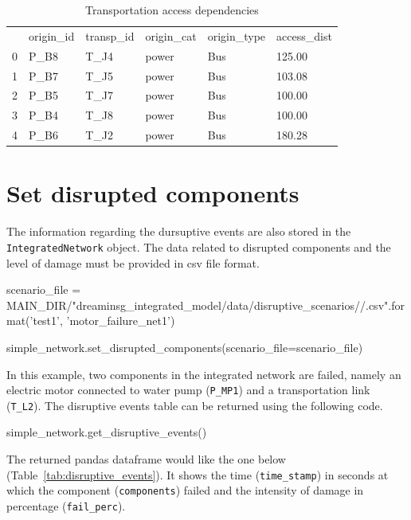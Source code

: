 \documentclass[letterpaper,12pt,english]{sphinxmanual}
\begin{document}
\begin{table}[h!]
	\caption{Transportation access dependencies}
	\centering
	\begin{tabular}{llllll}
		\rowcolor[HTML]{C0C0C0} 
		& origin\_id & transp\_id & origin\_cat & origin\_type & access\_dist \\
		0 & P\_B8      & T\_J4      & power       & Bus          & 125.00       \\
		\rowcolor[HTML]{EFEFEF} 
		1 & P\_B7      & T\_J5      & power       & Bus          & 103.08       \\
		2 & P\_B5      & T\_J7      & power       & Bus          & 100.00       \\
		\rowcolor[HTML]{EFEFEF} 
		3 & P\_B4      & T\_J8      & power       & Bus          & 100.00       \\
		4 & P\_B6      & T\_J2      & power       & Bus          & 180.28      
	\end{tabular}
\label{tab:access_table}
\end{table}


\section{Set disrupted components}
The information regarding the dursuptive events are also stored in the {\tt IntegratedNetwork} object. The data related to disrupted components and the level of damage must be provided in csv file format.
\begin{sphinxVerbatim}[commandchars=\\\{\}]
scenario_file = MAIN_DIR/"dreaminsg_integrated_model/data/disruptive_scenarios/{}/{}.csv".format('test1', 'motor_failure_net1')

simple_network.set_disrupted_components(scenario_file=scenario_file)
\end{sphinxVerbatim}

In this example, two components in the integrated network are failed, namely an electric motor connected to water pump ({\tt P_MP1}) and a transportation link ({\tt T_L2}). The disruptive events table can be returned using the following code.

\begin{sphinxVerbatim}[commandchars=\\\{\}]
simple_network.get_disruptive_events()
\end{sphinxVerbatim}

The returned pandas dataframe would like the one below (Table~\ref{tab:disruptive_events}). It shows the time ({\tt time_stamp}) in seconds at which the component ({\tt components}) failed and the intensity of damage in percentage ({\tt fail_perc}).
\end{document}
